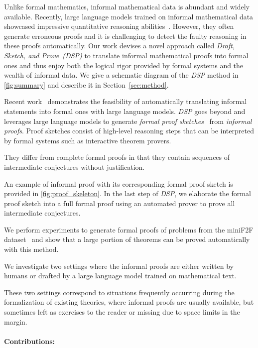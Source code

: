  Unlike formal mathematics, informal mathematical data is abundant and widely available. Recently, large language models trained on informal mathematical data showcased impressive quantitative reasoning abilities~\citep{lewkowycz2022solving, welleck2022naturalprover}. However, they often generate erroneous proofs and it is challenging to detect the faulty reasoning in these proofs automatically. Our work devises a novel approach called \textit{Draft, Sketch, and Prove~(\textit{DSP})} to translate informal mathematical proofs into formal ones and thus enjoy both the logical rigor provided by formal systems and the wealth of informal data. We give a schematic diagram of the \textit{DSP} method in \autoref{fig:summary} and describe it in Section~\ref{sec:method}.

Recent work~\citep{wu2022autoformalization} demonstrates the feasibility of automatically translating informal statements into formal ones with large language models.
\textit{DSP} goes beyond and leverages large language models to generate \textit{formal proof sketches}~\citep{wiedijk2003formal} from \textit{informal proofs}. Proof sketches consist of high-level reasoning steps that can be interpreted by formal systems such as interactive theorem provers.

They differ from complete formal proofs in that they contain sequences of intermediate conjectures without justification.

An example of informal proof with its corresponding formal proof sketch is provided in \autoref{fig:proof_skeleton}. In the last step of \textit{DSP}, we elaborate the formal proof sketch into a full formal proof using an automated prover to prove all intermediate conjectures.

We perform experiments to generate formal proofs of problems from the miniF2F dataset~\citep{zheng2021minif2f} and show that a large portion of theorems can be proved automatically with this method.

We investigate two settings where the informal proofs are either written by humans or drafted by a large language model trained on mathematical text.

These two settings correspond to situations frequently occurring during the formalization of existing theories, where informal proofs are usually available, but sometimes left as exercises to the reader or missing due to space limits in the margin.

\paragraph{Contributions:}

